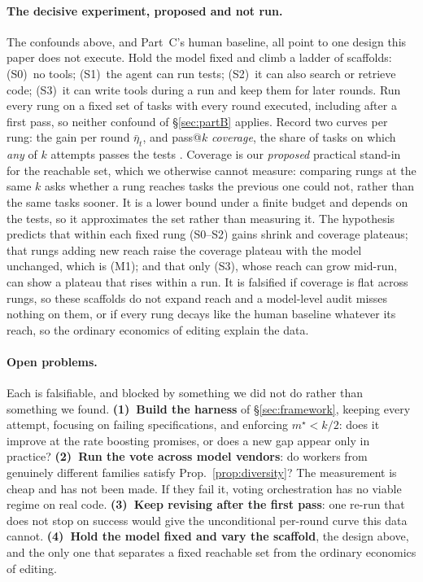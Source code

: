 \documentclass{article}
\theoremstyle{remark}
\theoremstyle{plain}
\begin{document}
\paragraph{The decisive experiment, proposed and not run.} The confounds above, and Part~C's human baseline, all point to one design this paper does not execute. Hold the model fixed and climb a ladder of scaffolds: (S0)~no tools; (S1)~the agent can run tests; (S2)~it can also search or retrieve code; (S3)~it can write tools during a run and keep them for later rounds. Run every rung on a fixed set of tasks with every round executed, including after a first pass, so neither confound of \S\ref{sec:partB} applies. Record two curves per rung: the gain per round $\bar\eta_t$, and pass@$k$ \emph{coverage}, the share of tasks on which \emph{any} of $k$ attempts passes the tests \citep{brown2024monkeys}. Coverage is our \emph{proposed} practical stand-in for the reachable set, which we otherwise cannot measure: comparing rungs at the same $k$ asks whether a rung reaches tasks the previous one could not, rather than the same tasks sooner. It is a lower bound under a finite budget and depends on the tests, so it approximates the set rather than measuring it. The hypothesis predicts that within each fixed rung (S0--S2) gains shrink and coverage plateaus; that rungs adding new reach raise the coverage plateau with the model unchanged, which is (M1); and that only (S3), whose reach can grow mid-run, can show a plateau that rises within a run. It is falsified if coverage is flat across rungs, so these scaffolds do not expand reach and a model-level audit misses nothing on them, or if every rung decays like the human baseline whatever its reach, so the ordinary economics of editing explain the data.

\paragraph{Open problems.} Each is falsifiable, and blocked by something we did not do rather than something we found. \textbf{(1)~Build the harness} of \S\ref{sec:framework}, keeping every attempt, focusing on failing specifications, and enforcing $m^\star{<}k/2$: does it improve at the rate boosting promises, or does a new gap appear only in practice? \textbf{(2)~Run the vote across model vendors}: do workers from genuinely different families satisfy Prop.~\ref{prop:diversity}? The measurement is cheap and has not been made. If they fail it, voting orchestration has no viable regime on real code. \textbf{(3)~Keep revising after the first pass}: one re-run that does not stop on success would give the unconditional per-round curve this data cannot. \textbf{(4)~Hold the model fixed and vary the scaffold}, the design above, and the only one that separates a fixed reachable set from the ordinary economics of editing.
\end{document}
